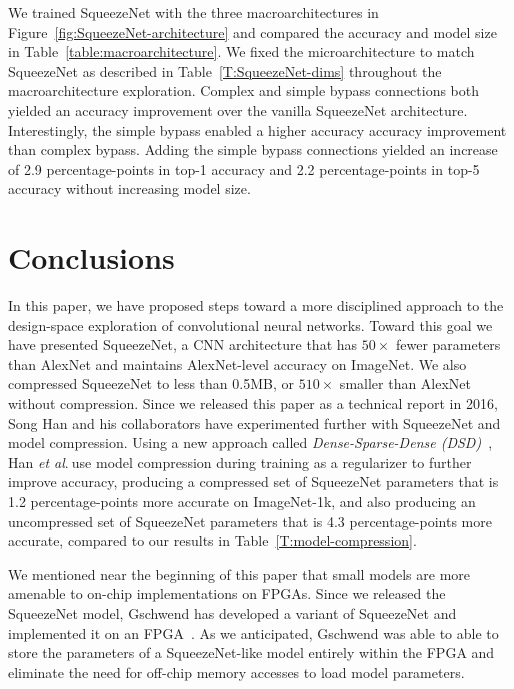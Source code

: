 \documentclass{article} \usepackage{iclr2017_conference,times}
\newcommand{\etal}{\textit{et al}.$~$}
\renewcommand{\cite}{\citep}
\def\vsp{\vspace{-0.15in}}
\begin{document}
We trained SqueezeNet with the three macroarchitectures in Figure~\ref{fig:SqueezeNet-architecture} and compared the accuracy and model size in Table~\ref{table:macroarchitecture}. 
We fixed the microarchitecture to match SqueezeNet as described in Table~\ref{T:SqueezeNet-dims} throughout the macroarchitecture exploration. 
Complex and simple bypass connections both yielded an accuracy improvement over the vanilla SqueezeNet architecture. Interestingly, the simple bypass enabled a higher accuracy accuracy improvement than complex bypass.
Adding the simple bypass connections yielded an increase of 2.9 percentage-points in top-1 accuracy and 2.2 percentage-points in top-5 accuracy without increasing model size. 




\section{Conclusions}
\label{sec:conclusions}
\vsp

In this paper, we have proposed steps toward a more disciplined approach to the design-space exploration of convolutional neural networks. 
Toward this goal we have presented SqueezeNet, a CNN architecture that has $50\times$ fewer parameters than AlexNet and maintains AlexNet-level accuracy on ImageNet.
We also compressed SqueezeNet to less than 0.5MB, or $510\times$ smaller than AlexNet without compression. 
Since we released this paper as a technical report in 2016, Song Han and his collaborators have experimented further with SqueezeNet and model compression.
Using a new approach called {\em Dense-Sparse-Dense (DSD)}~\cite{DSD}, Han \etal use model compression during training as a regularizer to further improve accuracy, producing a compressed set of SqueezeNet parameters that is 1.2 percentage-points more accurate on ImageNet-1k, and also producing an uncompressed set of SqueezeNet parameters that is 4.3 percentage-points more accurate, compared to our results in Table~\ref{T:model-compression}.

We mentioned near the beginning of this paper that small models are more amenable to on-chip implementations on FPGAs.
Since we released the SqueezeNet model, Gschwend has developed a variant of SqueezeNet and implemented it on an FPGA~\cite{ZynqNet}.
As we anticipated, Gschwend was able to able to store the parameters of a SqueezeNet-like model entirely within the FPGA and eliminate the need for off-chip memory accesses to load model parameters.
\end{document}
